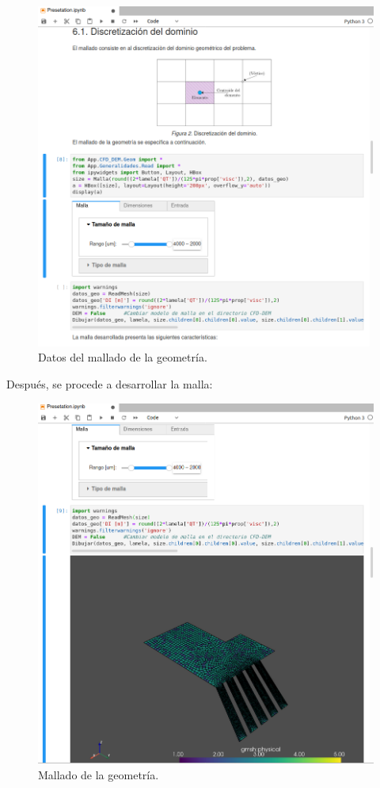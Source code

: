  \begin{figure}[h!]
	\centering
	\includegraphics[width=\textwidth]{Images/Anexos/7.png}
	\caption{Datos del mallado de la geometr\'ia.}
	\label{dataMalla}
\end{figure}

\newpage

\noindent
\justify

Despu\'es, se procede a desarrollar la malla:

\begin{figure}[h!]
	\centering
	\includegraphics[width=\textwidth]{Images/Anexos/8.png}
	\caption{Mallado de la geometr\'ia.}
	\label{MallaSoft}
\end{figure}

